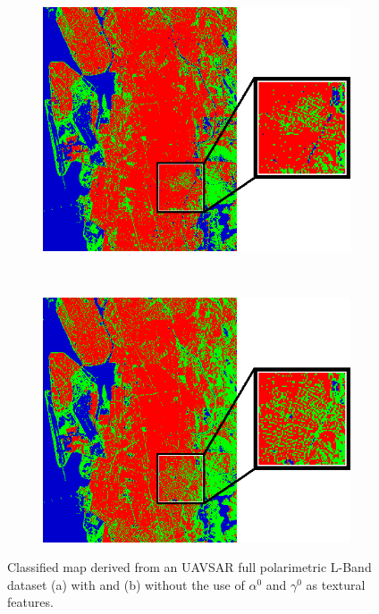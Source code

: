 



\begin{figure}[!h]
	\centering
	\begin{subfigure}[t]{0.4\columnwidth}
		\centering
		\includegraphics[width = \columnwidth]{Figures/REVIEW/TextureBZ}
		\caption{}
	\end{subfigure}%
	~ 
	\begin{subfigure}[t]{0.4\columnwidth}
		\centering
		\includegraphics[width = \columnwidth]{Figures/REVIEW/NoTextureBZ}
		\caption{}
	\end{subfigure}   
	\caption{Classified map derived from an UAVSAR full polarimetric L-Band dataset (a) with and (b) without the use of $\alpha^0$ and $\gamma^0$ as textural features. }
	\label{fig:texture}
\end{figure}

